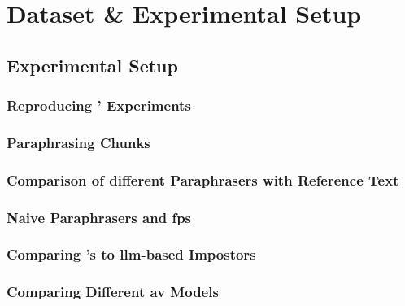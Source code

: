 \chapter{Dataset \& Experimental Setup}
\label{chap:dataset_experimental_setup}




\section{Experimental Setup}
\label{sec:experimental_setup}

\subsection{Reproducing \citet{koppel_determining_2014}' Experiments}

\subsection{Paraphrasing Chunks}

\subsection{Comparison of different Paraphrasers with Reference Text}

\subsection{Naive Paraphrasers and \acp{fp}}

\subsection{Comparing \citet{koppel_determining_2014}'s to \ac{llm}-based Impostors}

\subsection{Comparing Different \ac{av} Models}





